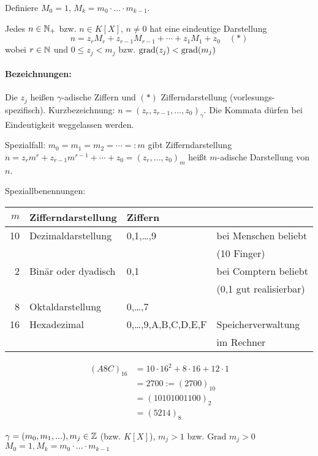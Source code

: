 \documentclass[a4paper,twoside,DIV15,BCOR12mm]{scrbook}
\begin{document}
Definiere $M_0=1$, $M_k=m_0\cdot \ldots \cdot m_{k-1}$.

\begin{satz}[Ziffernsatz]
Jedes $n\in\mathbb{N}_+$ bzw. $n\in K[X]$, $n\ne 0$ hat eine eindeutige
Darstellung
\[n = z_rM_r + z_{r-1}M_{r-1} + \cdots + z_1M_1 + z_0 \quad (*)\]
wobei $r\in\mathbb{N}$ und $0\le z_j < m_j$ bzw. $\mathop{\rm grad}\nolimits(z_j) < \mathop{\rm grad}\nolimits(m_j)$

\end{satz}

\paragraph{Bezeichnungen:}
Die $z_j$ heißen $\gamma$-adische Ziffern und $(*)$
Zifferndarstellung (vorlesungs-spezifisch). Kurzbezeichnung:
$n=(z_r,z_{r-1},\ldots,z_0)_\gamma$. Die Kommata dürfen bei
Eindeutigkeit weggelassen werden.

Spezialfall: $m_0=m_1=m_2=\cdots=:m$ gibt Zifferndarstellung
$n=z_rm^r + z_{r-1}m^{r-1}+\cdots+z_0 = (z_r,\ldots,z_0)_m$ heißt
$m$-adische Darstellung von $n$.

Speziallbenennungen:\\
\begin{tabular}[h]{r|l|l|l}
$m$ & Zifferndarstellung & Ziffern &  \\
\hline
10 & Dezimaldarstellung & 0,1,\ldots,9  & bei Menschen beliebt\\ &&& (10 Finger) \\
2 & Binär oder dyadisch & 0,1 & bei Comptern beliebt \\ &&& (0,1 gut realisierbar)  \\
8 & Oktaldarstellung & 0,\ldots,7 & \\
16 & Hexadezimal & 0,\ldots,9,A,B,C,D,E,F & Speicherverwaltung \\ &&& im Rechner \\
\end{tabular}

\begin{beispiel}
\begin{align*}
(A8C)_{16} &= 10\cdot 16^2 + 8\cdot 16 + 12\cdot 1 \\
&= 2700 := (2700)_{10} \\
&= (10101001100)_2 \\
&= (5214)_8
\end{align*}
\end{beispiel}

$\gamma = (m_0, m_1, ...), m_j \in \mathbb{Z}$ (bzw. $K[X]$), $m_j > 1$ bzw. $\text{Grad } m_j > 0$\\
$M_0 = 1, M_k = m_0 \cdot ... \cdot m_{k-1}$
\end{document}
